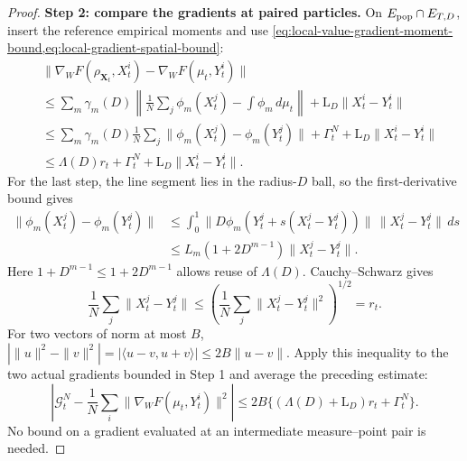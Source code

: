 \begin{proof}
\par\noindent\textbf{Step 2: compare the gradients at paired particles.}
On $E_{\rm pop}\cap E_{T,D}$, insert the reference empirical moments and use
\cref{eq:local-value-gradient-moment-bound,eq:local-gradient-spatial-bound}:
\begin{align*}
 &\|\nabla_WF(\rho_{\mathbf X_t},X_t^i)
                -\nabla_WF(\mu_t,Y_t^i)\|\\
 &\le\sum_m\gamma_m(D)
       \left\|\frac1N\sum_j\phi_m(X_t^j)-\int\phi_m\,d\mu_t\right\|
        +\mathrm L_D\|X_t^i-Y_t^i\|\\
 &\le\sum_m\gamma_m(D)\frac1N\sum_j
         \|\phi_m(X_t^j)-\phi_m(Y_t^j)\|
        +\Gamma_t^N+\mathrm L_D\|X_t^i-Y_t^i\|\\
 &\le\Lambda(D)r_t+\Gamma_t^N+\mathrm L_D\|X_t^i-Y_t^i\|.
\end{align*}
For the last step, the line segment lies in the radius-$D$ ball, so
the first-derivative bound gives
\[
 \begin{aligned}
 \|\phi_m(X_t^j)-\phi_m(Y_t^j)\|
 &\le\int_0^1
 \|D\phi_m(Y_t^j+s(X_t^j-Y_t^j))\|\,\|X_t^j-Y_t^j\|\,ds
 \\
 &\le L_m(1+2D^{m-1})\|X_t^j-Y_t^j\|.
 \end{aligned}
\]
Here $1+D^{m-1}\le1+2D^{m-1}$ allows reuse of $\Lambda(D)$.
Cauchy--Schwarz gives
\[
 \frac1N\sum_j\|X_t^j-Y_t^j\|
 \le\left(\frac1N\sum_j\|X_t^j-Y_t^j\|^2\right)^{1/2}=r_t.
\]
For two vectors of norm at most $B$,
$|\|u\|^2-\|v\|^2|=|\langle u-v,u+v\rangle|\le2B\|u-v\|$.
Apply this inequality to the two actual gradients bounded in Step 1
and average the preceding estimate:
\begin{equation}
 \left|\mathcal G_t^N-\frac1N\sum_i
          \|\nabla_WF(\mu_t,Y_t^i)\|^2\right|
 \le2B\{(\Lambda(D)+\mathrm L_D)r_t+\Gamma_t^N\}.
 \label{eq:trigger-paired-gradient-comparison}
\end{equation}
No bound on a gradient evaluated at an intermediate measure--point pair
is needed.


\end{proof}
